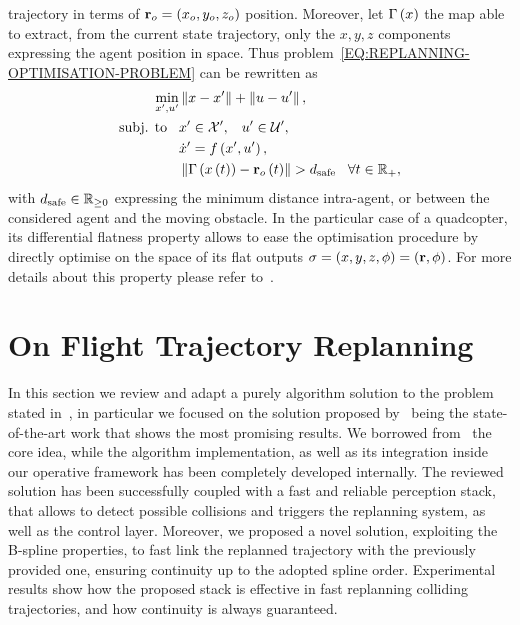 trajectory in terms of $\mathbf{r}_o = \left( x_o, y_o, z_o \right)$ position. Moreover, let $\Gamma \left( x \right)$ the map able to extract, from the
current state trajectory, only the $x,y,z$ components expressing the agent position in space. Thus problem~\eqref{EQ:REPLANNING-OPTIMISATION-PROBLEM}
can be rewritten as
\begin{equation*}
    \begin{split}
        \min_{x', u'} & \left \lVert {x- x'} \right \rVert + \left \lVert {u- u'} \right \rVert, \\
        \text{subj. to} \hspace{0.3cm} & x' \in \mathcal{X}', \hspace{0.3cm} u' \in \mathcal{U}', \\
        & \dot{x}' = f \left( x', u' \right), \\
        & \left \lVert {\Gamma \left(x\left(t \right)\right)- \mathbf{r}_o \left(t \right)} \right \rVert > d_{\text{safe}} \hspace{0.3cm} \forall t \in \mathbb{R}_{+},
    \end{split}
\end{equation*}
with $d_{\text{safe}} \in \mathbb{R}_{\ge 0}$ expressing the minimum distance intra-agent, or between the considered agent and the moving obstacle.
In the particular case of a quadcopter, its differential flatness property allows to ease the optimisation procedure by directly
optimise on the space of its flat outputs $\sigma =  \left( x, y, z, \phi \right) = \left( \mathbf{r}, \phi \right)$.
For more details about this property please refer to~.

\section{On Flight Trajectory Replanning}%
\label{SEC:REPLANNING-ALGORITHM}
In this section we review and adapt a purely algorithm solution to the problem stated in~,
in particular we focused on the solution proposed by~\cite{zhou2021raptor} being the state-of-the-art work that shows the most
promising results. We borrowed from~\cite{zhou2021raptor} the core idea, while the algorithm implementation, as well as its integration
inside our operative framework has been completely developed internally. The reviewed solution has been successfully coupled with a
fast and reliable perception stack, that allows to detect possible collisions and triggers the replanning system, as well as the control
layer. Moreover, we proposed a novel solution, exploiting the B-spline properties, to fast link the replanned trajectory with
the previously provided one, ensuring continuity up to the adopted spline order. Experimental results show how the proposed stack is
effective in fast replanning colliding trajectories, and how continuity is always guaranteed.

